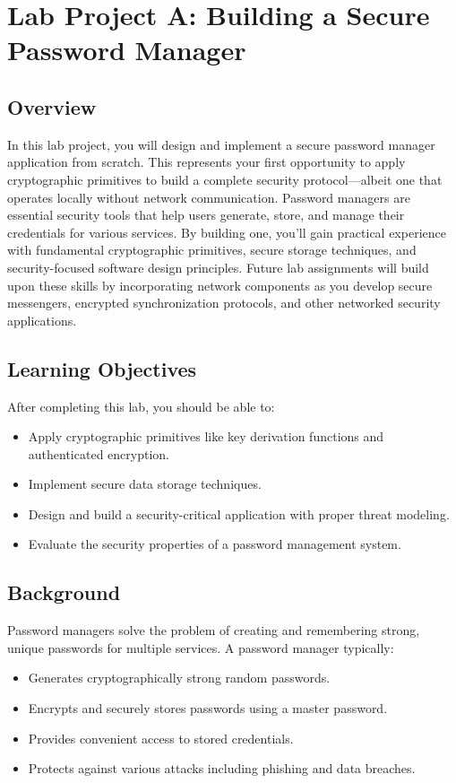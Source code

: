 \documentclass[10pt,a4paper,american]{article}
\begin{document}
\classhandoutheader

\section*{Lab Project A: Building a Secure Password Manager}

\subsection*{Overview}
In this lab project, you will design and implement a secure password manager application from scratch. This represents your first opportunity to apply cryptographic primitives to build a complete security protocol—albeit one that operates locally without network communication. Password managers are essential security tools that help users generate, store, and manage their credentials for various services. By building one, you'll gain practical experience with fundamental cryptographic primitives, secure storage techniques, and security-focused software design principles. Future lab assignments will build upon these skills by incorporating network components as you develop secure messengers, encrypted synchronization protocols, and other networked security applications.

\subsection*{Learning Objectives}
After completing this lab, you should be able to:
\begin{itemize}
	\item Apply cryptographic primitives like key derivation functions and authenticated encryption.
	\item Implement secure data storage techniques.
	\item Design and build a security-critical application with proper threat modeling.
	\item Evaluate the security properties of a password management system.
\end{itemize}

\subsection*{Background}
Password managers solve the problem of creating and remembering strong, unique passwords for multiple services. A password manager typically:
\begin{itemize}
	\item Generates cryptographically strong random passwords.
	\item Encrypts and securely stores passwords using a master password.
	\item Provides convenient access to stored credentials.
	\item Protects against various attacks including phishing and data breaches.
\end{itemize}
\end{document}
